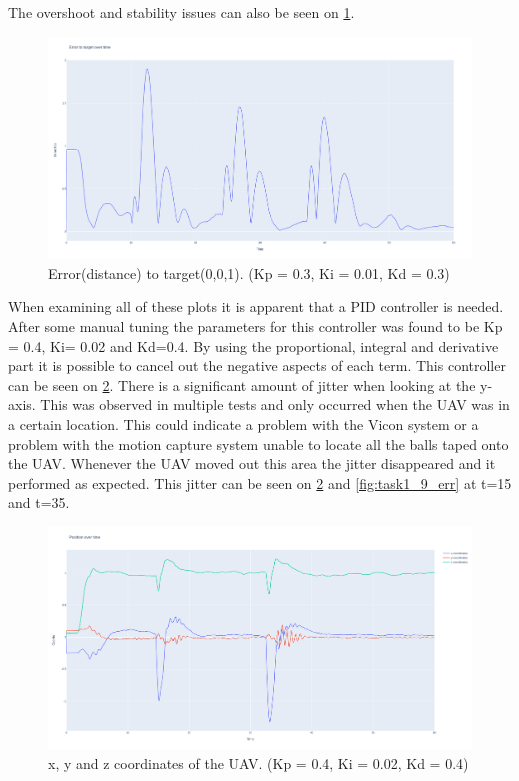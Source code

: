 \documentclass[conference]{IEEEtran}
\begin{document}
The overshoot and stability issues can also be seen on \cref{fig:task1_4_err}. 
\begin{figure}[hbtp]
	\centering
	\includegraphics[width=1.0\linewidth]{images/task1_4_err.png}
	\caption{Error(distance) to target(0,0,1). (Kp = 0.3, Ki = 0.01, Kd = 0.3)}
	\label{fig:task1_4_err}
\end{figure}

When examining all of these plots it is apparent that a PID controller is needed. After some manual tuning the parameters for this controller was found to be Kp = 0.4, Ki= 0.02 and Kd=0.4. By using the proportional, integral and derivative part it is possible to cancel out the negative aspects of each term. This controller can be seen on \cref{fig:task1_9_pos}. There is a significant amount of jitter when looking at the y-axis. This was observed in multiple tests and only occurred when the UAV was in a certain location. This could indicate a problem with the Vicon system or a problem with the motion capture system unable to locate all the balls taped onto the UAV. Whenever the UAV moved out this area the jitter disappeared and it performed as expected. This jitter can be seen on \cref{fig:task1_9_pos} and \cref{fig:task1_9_err} at t=15 and t=35.

\begin{figure}[hbtp]
	\centering
	\includegraphics[width=1.0\linewidth]{images/task1_9_pos.png}
	\caption{x, y and z coordinates of the UAV. (Kp = 0.4, Ki = 0.02, Kd = 0.4)}
	\label{fig:task1_9_pos}
\end{figure}
\end{document}

